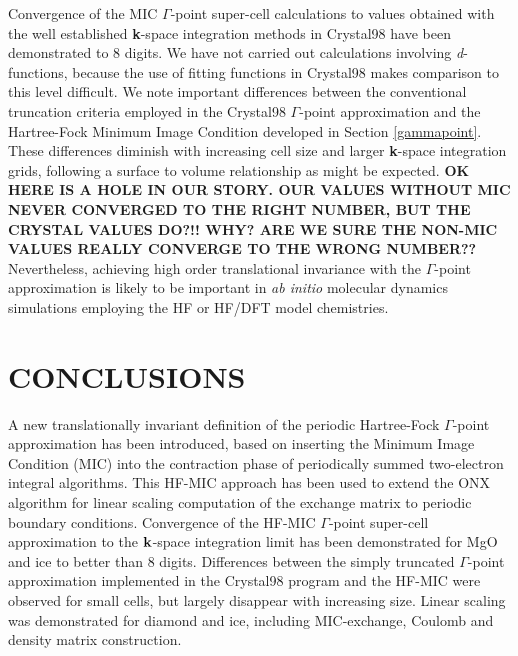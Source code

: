 \documentclass[prb,aps,nobibnotes,twocolumn,doublespace,twocolumngrid,superbib]{revtex4}
\begin{document}
Convergence of the MIC $\Gamma$-point super-cell calculations to values obtained with 
the well established {\bf k}-space integration methods in {\sc Crystal98} have been 
demonstrated to 8 digits.  We have not carried out calculations involving 
{\it d}-functions, because the use of fitting functions in {\sc Crystal98} makes
comparison to this level difficult.  We note important differences between the 
conventional truncation criteria employed in the {\sc Crystal98} $\Gamma$-point
approximation and the Hartree-Fock Minimum Image Condition developed in Section 
\ref{gammapoint}.  These differences diminish with increasing cell size and larger 
{\bf k}-space integration grids, following a surface to volume relationship 
as might be expected. {\bf OK HERE IS A HOLE IN OUR STORY.  OUR VALUES WITHOUT MIC
NEVER CONVERGED TO THE RIGHT NUMBER, BUT THE CRYSTAL VALUES DO?!!  WHY?  ARE WE
SURE THE NON-MIC VALUES REALLY CONVERGE TO THE WRONG NUMBER??}
Nevertheless, achieving high order translational invariance 
with the $\Gamma$-point approximation is likely to be important in {\em ab initio} 
molecular dynamics simulations employing the HF or HF/DFT model chemistries.


\section{CONCLUSIONS}

A new translationally invariant definition of the periodic Hartree-Fock 
$\Gamma$-point approximation has been introduced, based on inserting 
the Minimum Image Condition (MIC) into the contraction phase of periodically
summed two-electron integral algorithms.  This HF-MIC approach has been used 
to extend the {\sc ONX} algorithm for linear scaling computation of the exchange 
matrix to periodic boundary conditions.  Convergence of the HF-MIC $\Gamma$-point
super-cell approximation to the $\bf k$-space integration limit has been 
demonstrated for MgO and ice to better than 8 digits.  Differences between
the simply truncated $\Gamma$-point approximation implemented in the 
{\sc Crystal98} program and the HF-MIC were observed for small cells, but
largely disappear with increasing size. Linear scaling was demonstrated for
diamond and ice, including MIC-exchange, Coulomb and density matrix 
construction.   
\end{document}
